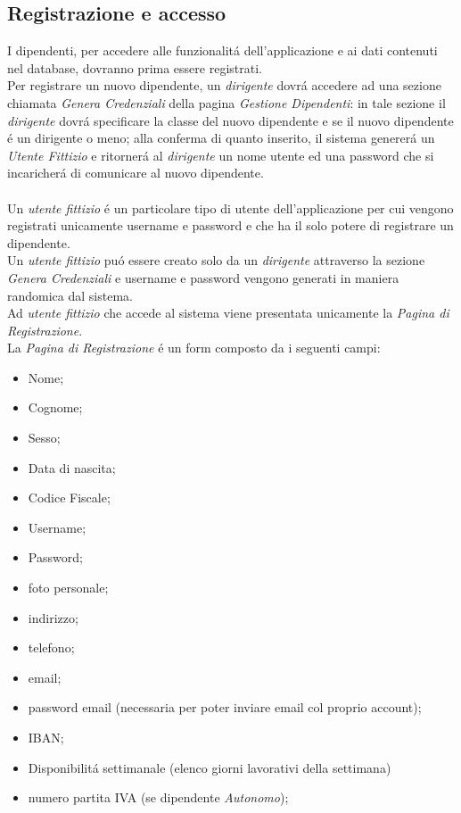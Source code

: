 \documentclass[paper=a4, fontsize=11pt]{scrartcl} %
\numberwithin{equation}{section} %
\numberwithin{figure}{section} %
\numberwithin{table}{section} %
\begin{document}
\subsection{Registrazione e accesso}
I dipendenti, per accedere alle funzionalit\'a dell'applicazione e ai dati contenuti
nel database, dovranno prima essere registrati.\\
Per registrare un nuovo dipendente, un \textit{dirigente}
dovr\'a accedere ad una sezione chiamata \textit{Genera Credenziali} della pagina \textit{Gestione Dipendenti}:
in tale sezione il \textit{dirigente} dovr\'a specificare
la classe del nuovo dipendente e se il nuovo dipendente \'e un dirigente o meno; alla conferma di quanto inserito, il
sistema generer\'a un \textit{Utente Fittizio} e ritorner\'a al \textit{dirigente} un nome utente ed una password
che si incaricher\'a di comunicare al nuovo dipendente.\\\\
Un  \textit{utente fittizio} \'e un particolare tipo di utente dell'applicazione per cui vengono registrati unicamente
username e password e che ha il solo potere di registrare un dipendente.\\
Un \textit{utente fittizio} pu\'o essere creato solo da un \textit{dirigente} attraverso la sezione \textit{Genera Credenziali}
e username e password vengono generati in maniera randomica dal sistema.\\
Ad \textit{utente fittizio} che accede al sistema viene presentata unicamente la \textit{Pagina di Registrazione}.\\
La \textit{Pagina di Registrazione} \'e un form composto da i seguenti campi:
\begin{itemize}
	\item Nome;
	\item Cognome;
	\item Sesso;
	\item Data di nascita;
	\item Codice Fiscale;
    \item Username;
    \item Password;
	\item foto personale;
	\item indirizzo;
	\item telefono;
	\item email;
    \item password email (necessaria per poter inviare email col proprio account);
	\item IBAN;
	\item Disponibilit\'a settimanale (elenco giorni lavorativi della settimana)
	\item numero partita IVA (se dipendente \textit{Autonomo});
\end{itemize}
\end{document}
